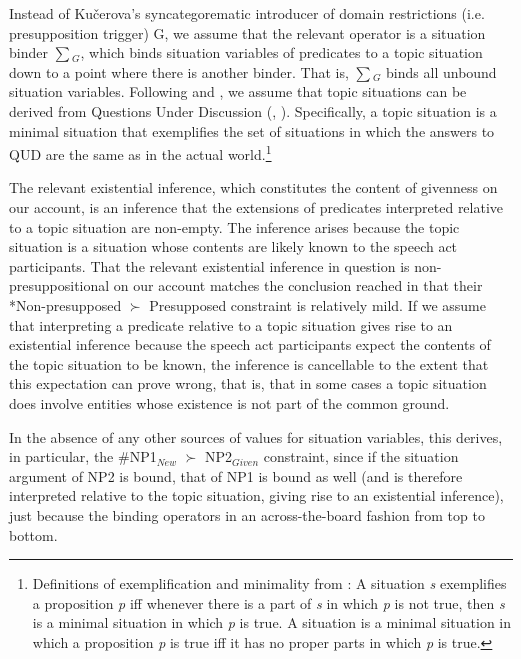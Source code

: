 \documentclass[output=paper,modfonts,nonflat]{langsci/langscibook}
\begin{document}
Instead of Ku\v{c}erova's syncategorematic introducer of domain restrictions (i.e. presupposition trigger) G, we assume that the relevant operator is a situation binder $\sum$$_{G}$, which binds situation variables of predicates to a topic situation down to a point where there is another binder. That is, $\sum$$_{G}$ binds all unbound situation variables. Following \citet{Kratzer:2017} and \citet[127--133]{Schwarz:2009}, we assume that topic situations can be derived from Questions Under Discussion (\citet{Roberts:1996}, \citet{Buring:2003}). Specifically, a topic situation is a minimal situation that exemplifies the set of situations in which the answers to QUD are the same as in the actual world.\footnote{Definitions of exemplification and minimality from \citet{Kratzer:2017}: A situation {\itshape s} exemplifies a proposition {\itshape p} iff whenever there is a part of {\itshape s} in which {\itshape p} is not true, then {\itshape s} is a minimal situation in which {\itshape p} is true.  A situation is a minimal situation in which a proposition {\itshape p} is true iff  it has no proper parts in which {\itshape p} is true.} 

The relevant existential inference, which constitutes the content of givenness on our account, is an inference that the extensions of predicates interpreted relative to a topic situation are non-empty. The inference arises because the topic situation is a situation whose contents are likely known to the speech act participants. That the relevant existential inference in question is non-presuppositional on our account matches the conclusion reached in \citet{SimikWierzba:2015} that their *Non-presupposed $\succ$ Presupposed constraint is relatively mild. If we assume that interpreting a predicate relative to a topic situation gives rise to an existential inference because the speech act participants expect the contents of the topic situation to be known, the inference is cancellable to the extent that this expectation can prove wrong, that is, that in some cases a topic situation does involve entities whose existence is not part of the common ground.

In the absence of any other sources of values for situation variables, this derives, in particular, the \#NP1$_{New}$ $\succ$ NP2$_{Given}$ constraint, since if the situation argument of NP2 is bound, that of NP1 is bound as well (and is therefore interpreted relative to the topic situation, giving rise to an existential inference), just because the binding operators in an across-the-board fashion from top to bottom.
\end{document}
